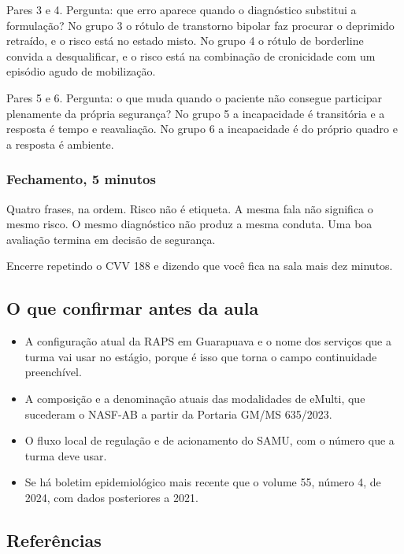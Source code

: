Pares 3 e 4. Pergunta: que erro aparece quando o diagnóstico substitui a formulação? No grupo 3 o rótulo de transtorno bipolar faz procurar o deprimido retraído, e o risco está no estado misto. No grupo 4 o rótulo de borderline convida a desqualificar, e o risco está na combinação de cronicidade com um episódio agudo de mobilização.

Pares 5 e 6. Pergunta: o que muda quando o paciente não consegue participar plenamente da própria segurança? No grupo 5 a incapacidade é transitória e a resposta é tempo e reavaliação. No grupo 6 a incapacidade é do próprio quadro e a resposta é ambiente.

\subsubsection*{Fechamento, 5 minutos}

Quatro frases, na ordem. Risco não é etiqueta. A mesma fala não significa o mesmo risco. O mesmo diagnóstico não produz a mesma conduta. Uma boa avaliação termina em decisão de segurança.

Encerre repetindo o CVV 188 e dizendo que você fica na sala mais dez minutos.

\filete

\subsection*{O que confirmar antes da aula}

\begin{itemize}[leftmargin=1.1em, itemsep=0.18em, topsep=0.30em]
  \item A configuração atual da RAPS em Guarapuava e o nome dos serviços que a turma vai usar no estágio, porque é isso que torna o campo continuidade preenchível.
  \item A composição e a denominação atuais das modalidades de eMulti, que sucederam o NASF-AB a partir da Portaria GM/MS 635/2023.
  \item O fluxo local de regulação e de acionamento do SAMU, com o número que a turma deve usar.
  \item Se há boletim epidemiológico mais recente que o volume 55, número 4, de 2024, com dados posteriores a 2021.
\end{itemize}

\filete

\subsection*{Referências}


